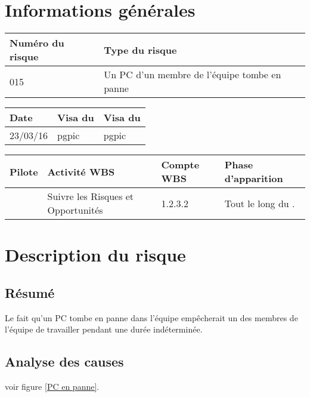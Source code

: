 
\section*{Informations générales}

\begin{table}[H]
\centering
	\begin{tabularx}{16.8cm}{|X|X|}
	\hline
	\rowcolor{gray!40} Numéro du risque & Type du risque \\
	\hline
	015 & Un PC d’un membre de l’équipe tombe en panne \\
	\hline
	\end{tabularx}
\end{table}

\begin{table}[H]
\centering
	\begin{tabularx}{16.8cm}{|X|X|X|}
	\hline
	\rowcolor{gray!40} Date & Visa du \RQ & Visa du \CP \\
	\hline
	 23/03/16 & pgpic & pgpic \\
	\hline
	\end{tabularx}
\end{table}

\begin{table}[H]
\centering
	\begin{tabularx}{16.8cm}{|X|X|X|X|}
	\hline
	\rowcolor{gray!40} Pilote & Activité WBS & Compte WBS & Phase d'apparition \\
	\hline
	 \Francois & Suivre les Risques et Opportunités & 1.2.3.2 & Tout le long du \PICCourt. \\
	\hline
	\end{tabularx}
\end{table}

\section*{Description du risque}

\subsection*{Résumé}
	Le fait qu'un PC tombe en panne dans l'équipe empêcherait un des membres de l'équipe de travailler pendant une durée indéterminée.
	
\subsection*{Analyse des causes}
	voir figure \ref{PC en panne}.

